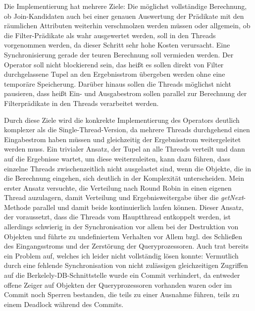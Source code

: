 \documentclass[a4paper,12pt,twoside]{article}
\newcommand{\Fb}[1]{\textit{#1}} %
\begin{document}
{Die Implementierung hat mehrere Ziele: Die möglichst vollständige Berechnung, ob Join-Kandidaten auch bei einer genauen Auswertung der Prädikate mit den räumlichen Attributen weiterhin verschmolzen werden müssen oder allgemein, ob die Filter-Prädikate als wahr ausgewertet werden, soll in den Threads vorgenommen werden, da dieser Schritt sehr hohe Kosten verursacht. Eine Synchronisierung gerade der teuren Berechnung soll vermieden werden. Der Operator soll nicht blockierend sein, das heißt es sollen direkt von Filter durchgelassene Tupel an den Ergebnisstrom übergeben werden ohne eine temporäre Speicherung. Darüber hinaus sollen die Threads möglichst nicht pausieren, dass heißt Ein- und Ausgabestrom sollen parallel zur Berechnung der Filterprädikate in den Threads verarbeitet werden.

Durch diese Ziele wird die konkrekte Implementierung des Operators deutlich komplexer als die Single-Thread-Version, da mehrere Threads durchgehend einen Eingabestrom haben müssen und gleichzeitig der Ergebnisstrom weitergeleitet werden muss. Ein trivialer Ansatz, der Tupel an alle Threads verteilt und dann auf die Ergebnisse wartet, um diese weiterzuleiten, kann dazu führen, dass einzelne Threads zwischenzeitlich nicht ausgelastet sind, wenn die Objekte, die in die Berechnung eingehen, sich deutlich in der Komplexität unterscheiden. Mein erster Ansatz versuchte, die Verteilung nach Round Robin in einen eigenen Thread auzulagern, damit Verteilung und Ergebnisweitergabe über die \Fb{getNext}-Methode parallel und damit beide kontinuierlich laufen können. Dieser Ansatz, der voraussetzt, dass die Threads vom Hauptthread entkoppelt werden, ist allerdings schwierig in der Synchronisation vor allem bei der Destruktion von Objekten und führte zu undefiniertem Verhalten vor Allem bzgl. des Schließen des Eingangsstroms und der Zerstörung der Queryprozessoren. Auch trat bereits ein Problem auf, welches ich leider nicht vollständig lösen konnte: Vermutlich durch eine fehlende Synchronisation von nicht zulässigen gleichzeitigen Zugriffen auf die Berkelely-DB-Schnittstelle wurde ein Commit verhindert, da entweder offene Zeiger auf Objekten der Queryprozessoren vorhanden waren oder im Commit noch Sperren bestanden, die teils zu einer Ausnahme führen, teils zu einem Deadlock während des Commits.

}
\end{document}
